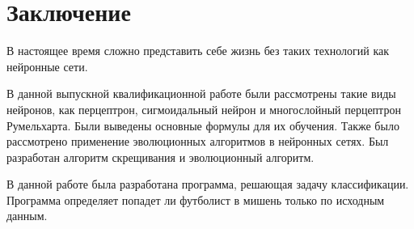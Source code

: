 \newpage

\chapter*{Заключение}

В настоящее время сложно представить себе жизнь без таких технологий как нейронные сети. 

В данной выпускной квалификационной работе были рассмотрены такие виды нейронов, как перцептрон, сигмоидальный нейрон и многослойный перцептрон Румельхарта. Были выведены основные формулы для их обучения. Также было рассмотрено применение эволюционных алгоритмов в нейронных сетях. Был разработан алгоритм скрещивания и эволюционный алгоритм.

В данной работе была разработана программа, решающая задачу классификации. Программа определяет попадет ли футболист в мишень только по исходным данным.